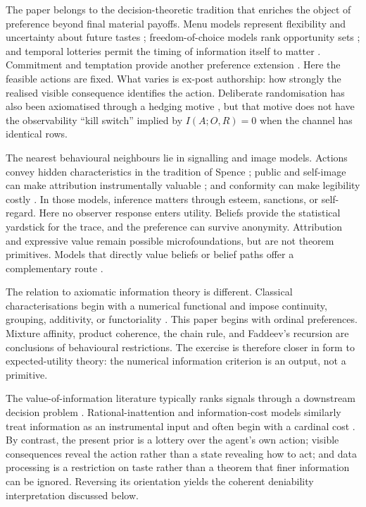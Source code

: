 \documentclass[11pt,a4paper]{article}
\theoremstyle{definition}
\newcommand{\1}{\mathbf 1}
\begin{document}
The paper belongs to the decision-theoretic tradition that enriches the object of preference beyond final material
payoffs.  Menu models represent flexibility and uncertainty about future tastes
\cite{Kreps1979,DekelLipmanRustichini2001}; freedom-of-choice models rank opportunity sets
\cite{PattanaikXu1990}; and temporal lotteries permit the timing of information itself to matter
\cite{KrepsPorteus1978,GrantKajiiPolak1998}.  Commitment and temptation provide another preference extension
\cite{GulPesendorfer2001}.  Here the feasible actions are fixed.  What varies is ex-post authorship:
how strongly the realised visible consequence identifies the action.  Deliberate randomisation has also been
axiomatised through a hedging motive \cite{CerreiaVioglioDillenbergerOrtolevaRiella2019}, but that motive does not have
the observability ``kill switch'' implied by $I(A;O,R)=0$ when the channel has identical rows.

The nearest behavioural neighbours lie in signalling and image models.  Actions convey hidden characteristics in the
tradition of Spence \cite{Spence1973}; public and self-image can make attribution instrumentally valuable
\cite{GlazerKonrad1996,BenabouTirole2002,BenabouTirole2006,AndreoniBernheim2009}; and conformity can make legibility
costly \cite{Bernheim1994}.  In those models, inference matters through esteem, sanctions, or self-regard.  Here no
observer response enters utility.  Beliefs provide the statistical yardstick for the trace, and the preference can
survive anonymity.  Attribution and expressive value remain possible microfoundations, but are not theorem
primitives.  Models that directly value beliefs or belief paths offer a complementary route
\cite{CaplinLeahy2001,ElyFrankelKamenica2015}.

The relation to axiomatic information theory is different.  Classical characterisations begin with a numerical
functional and impose continuity, grouping, additivity, or functoriality
\cite{Shannon1948,Khinchin1957,Faddeev1956,Renyi1961,AczelDaroczy1975,Hobson1969,BaezFritzLeinster2011,BaezFritz2014,Csiszar2008}.
This paper begins with ordinal preferences.  Mixture affinity, product coherence, the chain rule, and Faddeev's
recursion are conclusions of behavioural restrictions.  The exercise is therefore closer in form to expected-utility
theory: the numerical information criterion is an output, not a primitive.

The value-of-information literature typically ranks signals through a downstream decision problem
\cite{GilboaLehrer1991,AzrieliLehrer2008,CabralesGossnerSerrano2013}.  Rational-inattention and information-cost
models similarly treat information as an instrumental input and often begin with a cardinal cost
\cite{Blackwell1953,PomattoStrackTamuz2023,CaplinDeanLeahy2022,Denti2022,FrankelKamenica2019}.  By contrast, the present prior is a
lottery over the agent's own action; visible consequences reveal the action rather than a state revealing how to act;
and data processing is a restriction on taste rather than a theorem that finer information can be ignored.  Reversing
its orientation yields the coherent deniability interpretation discussed below.
\end{document}
